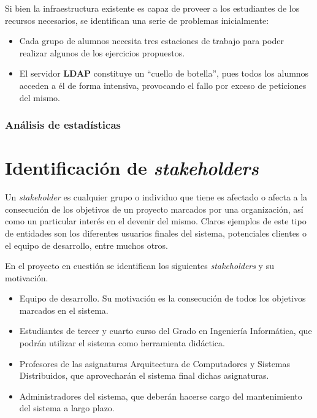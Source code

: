 Si bien la infraestructura existente es capaz de proveer a los estudiantes de los recursos necesarios, se identifican una serie de problemas inicialmente:

\begin{itemize}
  \item Cada grupo de alumnos necesita tres estaciones de trabajo para poder realizar algunos de los ejercicios propuestos.
  \item El servidor \textbf{LDAP} constituye un ``cuello de botella'', pues todos los alumnos acceden a él de forma intensiva, provocando el fallo por exceso de peticiones del mismo.
\end{itemize}

\subsubsection{Análisis de estadísticas}
\label{dominio:estadisticast}

\section{Identificación de \textit{stakeholders}}

Un \textit{stakeholder} es cualquier grupo o individuo que tiene es afectado o afecta a la consecución de los objetivos de un proyecto marcados por una organización, así como un particular interés en el devenir del mismo. Claros ejemplos de este tipo de entidades son los diferentes usuarios finales del sistema, potenciales clientes o el equipo de desarrollo, entre muchos otros.

En el proyecto en cuestión se identifican los siguientes \textit{stakeholders} y su motivación.

\begin{itemize}
  \item Equipo de desarrollo. Su motivación es la consecución de todos los objetivos marcados en el sistema.
  \item Estudiantes de tercer y cuarto curso del Grado en Ingeniería Informática, que podrán utilizar el sistema como herramienta didáctica.
  \item Profesores de las asignaturas Arquitectura de Computadores y Sistemas Distribuidos, que aprovecharán el sistema final dichas asignaturas.
  \item Administradores del sistema, que deberán hacerse cargo del mantenimiento del sistema a largo plazo.
\end{itemize}


